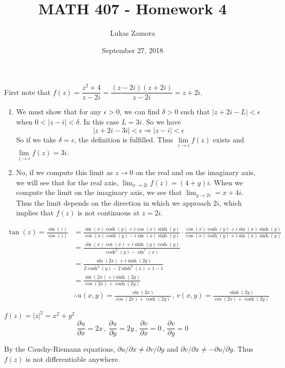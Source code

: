 \documentclass{article}
\title{MATH 407 - Homework 4}
\author{Lukas Zamora}
\date{September 27, 2018}
\theoremstyle{definition}
\begin{document}
    \maketitle
    
    \begin{prob}{2.102} $  $ \\
    	First note that $ f(z) = \dfrac{z^2+4}{z-2i} = \dfrac{(z-2i)(z+2i)}{z-2i} = z+2i $.
    	\begin{enumerate}[label=\alph*.)]
    		\item We must show that for any $ \epsilon > 0 $, we can find $ \delta > 0 $ such that $ |z+2i - L| < \epsilon $ when $ 0 < |z-i| < \delta $. In this case $ L = 3i $. So we have 
    		\[
    			|z+2i-3i| < \epsilon \Rightarrow |z-i| < \epsilon
    		\]
    		So if we take $ \delta = \epsilon $, the definition is fulfilled. Thus $ \lim\limits_{z\to i} f(z) $ exists and $ \lim\limits_{z\to i} f(z) = 3i $.
    		
    		\item No, if we compute this limit as $ z \to 0 $ on the real and on the imaginary axis, we will see that for the real axis, $ \lim_{x\to 2i} f(z) = (4+y)i $. When we compute the limit on the imaginary axis, we see that $ \lim_{y\to 2i} = x+4i $. Thus the limit depends on the direction in which we approach $ 2i $, which implies that $ f(z) $ is not continuous at $ z=2i $.
    	\end{enumerate}
    \end{prob}

	\begin{prob}{2.142}
		\begin{align*}
			\tan(z) = \frac{\sin(z)}{\cos(z)} &= \frac{\sin(x)\cosh(y) + i \cos(x)\sinh(y)}{\cos(x)\cosh(y) - i \sin(x)\sinh(y)} \cdot \frac{\cos(x)\cosh(y) + i \sin(x)\sinh(y)}{\cos(x)\cosh(y) + i \sin(x)\sinh(y)} \\
			& = \frac{\sin(x)\cos(x) + i \sinh(y)\cosh(y)}{\cosh^2(y) - \sin^2(x)} \\
			& = \frac{\sin(2x) + i \sinh(2y)}{2\cosh^2(y) - 2\sinh^2(x) + 1 - 1} \\
			& = \frac{\sin(2x) + i \sinh(2y)}{\cos(2x) + \cosh(2y)} \\
			& \therefore \boxed{ u(x,y) = \frac{\sin(2x)}{\cos(2x) + \cosh(2y)} \, , \, v(x,y) = \frac{\sinh(2y)}{\cos(2x) + \cosh(2y)} }
		\end{align*}
	\end{prob}

	\begin{prob}{3.45} $ $ \vspace{2mm} \\
		$ f(z) = |z|^2 = x^2+y^2 $
		$$ \dfrac{\partial u}{\partial x} = 2x \, , \, \dfrac{\partial u}{\partial y} = 2y \, , \, \dfrac{\partial v}{\partial x} = 0 \, , \, \dfrac{\partial v}{\partial y} = 0 $$
		
		By the Cauchy-Riemann equations, $ \partial u / \partial x \neq \partial v / \partial y $ and $ \partial v / \partial x \neq - \partial u / \partial y $. Thus $ f(z) $ is not differentiable anywhere.
	\end{prob}
\end{document}
